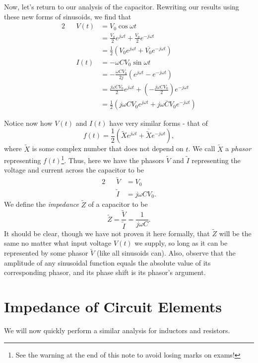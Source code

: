 \documentclass[letterpaper]{article}
\theoremstyle{remark}
\renewcommand{\tilde}[1]{\widetilde{#1}}
\newcommand{\eqn}[1]{\begin{alignat*}{2}#1\end{alignat*}}
\begin{document}
Now, let's return to our analysis of the capacitor. Rewriting our results using these new forms of sinusoids, we find that
\eqn{
    && V(t) &= V_0\cos{\omega t} \\
    &&&= \frac{V_0}{2} e^{j\omega t} + \frac{V_0}{2} e^{-j\omega t} \\
    &&&= \frac{1}{2} \left( V_0 e^{j\omega t} + \overline{V_0} e^{-j\omega t} \right) \\
    && I(t) &= -\omega C V_0 \sin{\omega t} \\
    &&&= -\frac{\omega C V_0}{2j} (e^{j\omega t} - e^{-j\omega t}) \\
    &&&= \frac{j\omega C V_0}{2} e^{j\omega t} + (-\frac{j\omega C V_0}{2}) e^{-j\omega t} \\
    &&&= \frac{1}{2} \left(j \omega C V_0 e^{j\omega t} + \overline{j \omega C V_0} e^{-j\omega t} \right)
}

Notice now how $V(t)$ and $I(t)$ have very similar forms - that of
\[
    f(t) = \frac{1}{2} \left(\tilde{X}e^{j\omega t} + \overline{\tilde{X}} e^{-j\omega t} \right),
\]
where $\tilde{X}$ is some complex number that does not depend on $t$. We call $\tilde{X}$ a \emph{phasor} representing $f(t)$\footnote{See the warning at the end of this note to avoid losing marks on exams!}. Thus, here we have the phasors $\tilde{V}$ and $\tilde{I}$ representing the voltage and current across the capacitor to be
\eqn{
    && \tilde{V} &= V_0 \\
    && \tilde{I} &= j\omega C V_0.
}
We define the \emph{impedance} $\tilde{Z}$ of a capacitor to be
\[
    \tilde{Z} = \frac{\tilde{V}}{\tilde{I}} = \frac{1}{j\omega C}.
\]
It should be clear, though we have not proven it here formally, that $\tilde{Z}$ will be the same no matter what input voltage $V(t)$ we supply, so long as it can be represented by some phasor $\tilde{V}$ (like all sinusoids can). Also, observe that the amplitude of any sinusoidal function equals the absolute value of its corresponding phasor, and its phase shift is its phasor's argument.

\section{Impedance of Circuit Elements}
We will now quickly perform a similar analysis for inductors and resistors.
\end{document}
